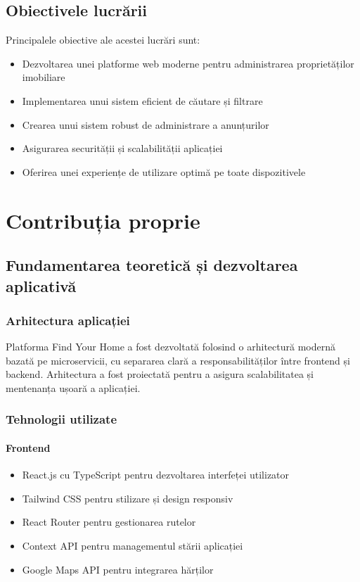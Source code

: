 \documentclass[12pt,a4paper]{report}
\begin{document}
\section{Obiectivele lucrării}
Principalele obiective ale acestei lucrări sunt:
\begin{itemize}
    \item Dezvoltarea unei platforme web moderne pentru administrarea proprietăților imobiliare
    \item Implementarea unui sistem eficient de căutare și filtrare
    \item Crearea unui sistem robust de administrare a anunțurilor
    \item Asigurarea securității și scalabilității aplicației
    \item Oferirea unei experiențe de utilizare optimă pe toate dispozitivele
\end{itemize}

\chapter{Contribuția proprie}
\section{Fundamentarea teoretică și dezvoltarea aplicativă}
\subsection{Arhitectura aplicației}
Platforma Find Your Home a fost dezvoltată folosind o arhitectură modernă bazată pe microservicii, cu separarea clară a responsabilităților între frontend și backend. Arhitectura a fost proiectată pentru a asigura scalabilitatea și mentenanța ușoară a aplicației.

\subsection{Tehnologii utilizate}
\subsubsection{Frontend}
\begin{itemize}
    \item React.js cu TypeScript pentru dezvoltarea interfeței utilizator
    \item Tailwind CSS pentru stilizare și design responsiv
    \item React Router pentru gestionarea rutelor
    \item Context API pentru managementul stării aplicației
    \item Google Maps API pentru integrarea hărților
\end{itemize}
\end{document}
